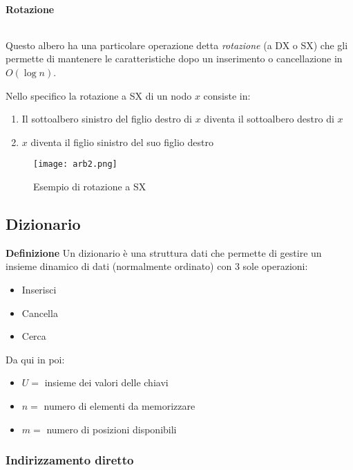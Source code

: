 \documentclass{article}
\begin{document}
\paragraph{Rotazione} $\ $\newline

\noindent Questo albero ha una particolare operazione detta \textit{rotazione} (a DX o SX) che gli permette di mantenere le caratteristiche dopo un inserimento o cancellazione in $O(\log n)$.\newline

\noindent Nello specifico la rotazione a SX di un nodo $x$ consiste in:
\begin{enumerate}
    \item Il sottoalbero sinistro del figlio destro di $x$ diventa il sottoalbero destro di $x$
    \item $x$ diventa il figlio sinistro del suo figlio destro\newline
\end{enumerate}

\begin{figure}[ht]
    \centering
    \texttt{[image: arb2.png]}
    \caption{Esempio di rotazione a SX}
    \label{fig:arb2}
\end{figure}

\subsection{Dizionario}

\textbf{Definizione} Un dizionario è una struttura dati che permette di gestire un insieme dinamico di dati (normalmente ordinato) con 3 sole operazioni:
\begin{itemize}
    \item Inserisci
    \item Cancella
    \item Cerca\newline
\end{itemize}

\noindent Da qui in poi:
\begin{itemize}
    \item $U=$ insieme dei valori delle chiavi
    \item $n=$ numero di elementi da memorizzare
    \item $m=$ numero di posizioni disponibili
\end{itemize}

\subsubsection{Indirizzamento diretto}
\end{document}
